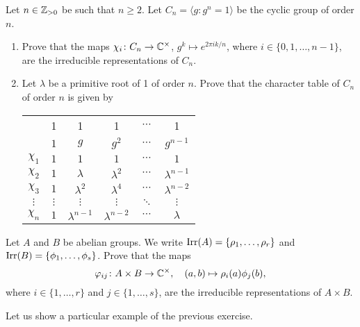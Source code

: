 \begin{exercise}
	Let $n\in\mathbb{Z}_{>0}$ be such that $n\geq2$. Let 
$C_n=\langle g:g^n=1\rangle$ be the cyclic group of order $n$.
\begin{enumerate}
    \item Prove that the maps  
        $\chi_i\colon C_n\to\mathbb{C}^\times$, $g^k\mapsto e^{2\pi ik/n}$, where $i\in\{0,1,\dots,n-1\}$, 
        are the irreducible representations of $C_n$. 
    \item Let $\lambda$ be a primitive root of 1 of order $n$. Prove that 
        the character table of $C_n$ of order $n$ is given by 
	\begin{center}
		\begin{tabular}{|c|ccccc|}
			\hline 
			& 1 & 1 & 1 & $\cdots$ & 1\tabularnewline
			& $1$ & $g$ & $g^2$ & $\cdots$ & $g^{n-1}$\tabularnewline
			\hline 
			$\chi_{1}$ & $1$ & $1$ & $1$ & $\cdots$ & $1$\tabularnewline
			$\chi_{2}$ & $1$ & $\lambda$ & $\lambda^2$ & $\cdots$ & $\lambda^{n-1}$\tabularnewline
			$\chi_{3}$ & $1$ & $\lambda^2$ & $\lambda^4$ & $\cdots$ & $\lambda^{n-2}$\tabularnewline
			$\vdots$ & $\vdots$ & $\vdots$ & $\vdots$ & $\ddots$ & $\vdots$\tabularnewline
			$\chi_{n}$ & $1$ & $\lambda^{n-1}$ & $\lambda^{n-2}$ & $\cdots$ & $\lambda$\tabularnewline
			\hline
		\end{tabular}
	\end{center}
\end{enumerate}
\end{exercise}

\begin{exercise}
    Let $A$ and $B$ be abelian groups. We write $\operatorname{Irr}(A)=\{\rho_1,\dots,\rho_r\}$ and 
    $\operatorname{Irr}(B)=\{\phi_1,\dots,\phi_s\}$. Prove
    that the maps 
    \[
    \varphi_{ij}\colon A\times B\to\mathbb{C}^\times,\quad
    (a,b)\mapsto\rho_i(a)\phi_j(b),
    \]
    where $i\in\{1,\dots,r\}$ and $j\in\{1,\dots,s\}$, are the irreducible representations of $A\times B$. 
\end{exercise}

Let us show a particular example of the previous exercise. 

